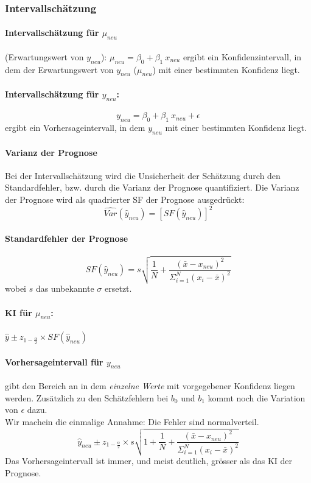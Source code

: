 \documentclass[a3paper, 8pt]{extarticle}
\begin{document}
\begin{multicols*}{5}
\subsubsection{Intervallschätzung}
\paragraph{Intervallschätzung für $\mu_{neu}$} (Erwartungswert von $y_{neu}$): $\mu_{neu}=\beta_0+\beta_1 \: x_{neu}$ ergibt ein Konfidenzintervall, in dem der Erwartungswert von $y_{neu}$ ($\mu_{neu}$) mit einer bestimmten Konfidenz liegt.

\paragraph{Intervallschätzung für $y_{neu}$:} $$y_{neu} = \beta_0 + \beta_1 \: x_{neu} + \epsilon$$ ergibt ein Vorhersageintervall, in dem $y_{neu}$ mit einer bestimmten Konfidenz liegt.

\paragraph{Varianz der Prognose} 
Bei der Intervallschätzung wird die Unsicherheit der Schätzung durch den Standardfehler, bzw. durch die Varianz der Prognose quantifiziert. Die Varianz der Prognose wird als quadrierter SF der Prognose ausgedrückt:
$$\widehat{Var}(\hat{y}_{neu})= [SF(\hat{y}_{neu})]^2$$

\paragraph{Standardfehler der Prognose} $$SF(\hat{y}_{neu})=s\sqrt{\frac{1}{N}+\frac{(\bar{x}-x_{neu})^2}{\Sigma_{i=1}^N(x_i-\bar{x})^2}}$$ wobei $s$ das unbekannte $\sigma$ ersetzt. 

\paragraph{KI für $\mu_{neu}$:} 
$\hat{y}\pm z_{1-\frac{\alpha}{2}} \times SF(\hat{y}_{neu})$

\paragraph{Vorhersageintervall für $y_{neu}$}
gibt den Bereich an in dem \textit{einzelne Werte} mit vorgegebener Konfidenz liegen werden. Zusätzlich zu den Schätzfehlern bei $b_0$ und $b_1$ kommt noch die Variation von $\epsilon$ dazu.\\
Wir machein die einmalige Annahme: Die Fehler sind normalverteil.
$$\hat{y}_{neu} \pm z_{1-\frac{\alpha}{2}} \times s \sqrt{1+\frac{1}{N}+\frac{(\bar{x}-x_{neu})^2}{\Sigma_{i=1}^N(x_i-\bar{x})^2}}$$
Das Vorhersageintervall ist immer, und meist deutlich, grösser als das KI der Prognose.


\end{multicols*}
\end{document}
